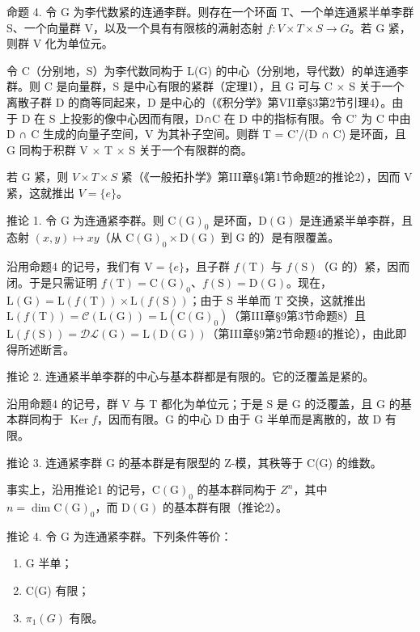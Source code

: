 命题 4. 令 G 为李代数紧的连通李群。则存在一个环面 T、一个单连通紧半单李群 S、一个向量群 V，以及一个具有有限核的满射态射 \(f: V \times T \times S \to G\)。若 G 紧，则群 V 化为单位元。

令 C（分别地，S）为李代数同构于 L(G) 的中心（分别地，导代数）的单连通李群。则 C 是向量群，S 是中心有限的紧群（定理1），且 G 可与 C × S 关于一个离散子群 D 的商等同起来，D 是中心的（《积分学》第VII章§3第2节引理4）。由于 D 在 S 上投影的像中心因而有限，D∩C 在 D 中的指标有限。令 C' 为 C 中由 D ∩ C 生成的向量子空间，V 为其补子空间。则群 T = C'/(D ∩ C) 是环面，且 G 同构于积群 V × T × S 关于一个有限群的商。

若 G 紧，则 \(V \times T \times S\) 紧（《一般拓扑学》第III章§4第1节命题2的推论2），因而 V 紧，这就推出 \(V = \{e\}\)。

推论 1. 令 G 为连通紧李群。则 \(\mathrm{C}(\mathrm{G})_{0}\) 是环面，\(\mathrm{D}(\mathrm{G})\) 是连通紧半单李群，且态射 \((x,y)\mapsto xy\)（从 \(\mathrm{C}(\mathrm{G})_{0}\times\mathrm{D}(\mathrm{G})\) 到 G 的）是有限覆盖。

沿用命题4 的记号，我们有 \(\mathrm{V} = \{e\}\)，且子群 \(f(\mathrm{T})\) 与 \(f(\mathrm{S})\)（\(\mathrm{G}\) 的）紧，因而闭。于是只需证明 \(f(\mathrm{T}) = \mathrm{C}(\mathrm{G})_0\)、\(f(\mathrm{S}) = \mathrm{D}(\mathrm{G})\)。现在，\(\mathrm{L}(\mathrm{G}) = \mathrm{L}(f(\mathrm{T})) \times \mathrm{L}(f(\mathrm{S}))\)；由于 \(\mathrm{S}\) 半单而 \(\mathrm{T}\) 交换，这就推出 \(\mathrm{L}(f(\mathrm{T})) = \mathcal{C}(\mathrm{L}(\mathrm{G})) = \mathrm{L}(\mathrm{C}(\mathrm{G})_0)\)（第III章§9第3节命题8）且 \(\mathrm{L}(f(\mathrm{S})) = \mathcal{DL}(\mathrm{G}) = \mathrm{L}(\mathrm{D}(\mathrm{G}))\)（第III章§9第2节命题4的推论），由此即得所述断言。

推论 2. 连通紧半单李群的中心与基本群都是有限的。它的泛覆盖是紧的。

沿用命题4 的记号，群 V 与 T 都化为单位元；于是 S 是 G 的泛覆盖，且 G 的基本群同构于 \(\operatorname{Ker} f\)，因而有限。G 的中心 D 由于 G 半单而是离散的，故 D 有限。

推论 3. 连通紧李群 G 的基本群是有限型的 Z-模，其秩等于 C(G) 的维数。

事实上，沿用推论1 的记号，\(\mathrm{C}(\mathrm{G})_{0}\) 的基本群同构于 \(Z^{n}\)，其中 \(n = \dim \mathrm{C}(\mathrm{G})_{0}\)，而 \(\mathrm{D}(\mathrm{G})\) 的基本群有限（推论2）。

推论 4. 令 G 为连通紧李群。下列条件等价：

\begin{enumerate}
\def\labelenumi{(\roman{enumi})}
\item
  G 半单；
\item
  C(G) 有限；
\item
  \(\pi_{1}(G)\) 有限。
\end{enumerate}

